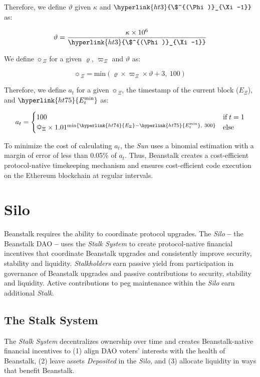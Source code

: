 \documentclass[tikz]{article}
\newcommand{\term}[1]{\textsl{#1}}
\newcommand{\bean}{} %
\begin{document}
Therefore, we define $\vartheta$ given $\kappa$ and $\hyperlink{ht3}{\$^{\bean(\Phi)}_{\Xi-1}}$ as:

$$ \vartheta = \frac{\kappa \times 10^6}{\hyperlink{ht3}{\$^{\bean(\Phi)}_{\Xi-1}}}$$

We define $\sun_{\Xi}$ for a given $\varrho$, $\varpi_\Xi$ and $\vartheta$ as:

$$\sun_{\Xi} = \text{min}(\varrho \times \varpi_\Xi \times \vartheta + 3,\ 100)$$

Therefore, we define $a_t$ for a given $\sun_{\Xi}$, the timestamp of the current block ($E_\Xi$), and $\hyperlink{ht75}{E_{t}^{\text{min}}}$ as:

$$ a_t =
\begin{cases}
{100} & \text{if} \; t = 1 \\
{\sun_{\Xi} \times 1.01^{\text{min}\{{\hyperlink{ht74}{E_\Xi} - \hyperlink{ht75}{E_{t}^{\text{min}}}},\ 300\}}} & \text{else}
\end{cases} 
$$

To minimize the cost of calculating \hyperlink{ht11}{$a_t$}, the \term{Sun} uses a binomial estimation with a margin of error of less than 0.05\% of \hyperlink{ht11}{$a_t$}. Thus, Beanstalk creates a cost-efficient protocol-native timekeeping mechanism and ensures cost-efficient code execution on the Ethereum blockchain at regular intervals.

\vspace*{-1mm}
\section{Silo}
\vspace*{-1mm}
Beanstalk requires the ability to coordinate protocol upgrades. The \term{Silo} \textbf{--} the Beanstalk DAO \textbf{--} uses the \term{Stalk System} to create protocol-native financial incentives that coordinate Beanstalk upgrades and consistently improve security, stability and liquidity. \term{Stalkholders} earn passive yield from participation in governance of Beanstalk upgrades and passive contributions to security, stability and liquidity. Active contributions to peg maintenance within the \term{Silo} earn additional \term{Stalk}.

\vspace*{-1mm}
\subsection{The Stalk System}
\vspace*{-1mm}
The \term{Stalk System} decentralizes ownership over time and creates Beanstalk-native financial incentives to (1) align DAO voters' interests with the health of Beanstalk, (2) leave assets \term{Deposited} in the \term{Silo}, and (3) allocate liquidity in ways that benefit Beanstalk.
\end{document}
